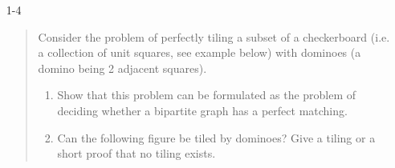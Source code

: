 \documentclass[12pt]{article}
\begin{document}




\begin{enumerate}





%
\item[1-4]
\begin{quote}
Consider the problem of perfectly tiling a subset of a checkerboard
  (i.e. a collection of unit squares, see example below) with dominoes
  (a domino being 2 adjacent squares).
\begin{enumerate}
\item
Show that this problem can be formulated as the problem of deciding
whether a bipartite graph has a perfect matching.
\item
Can the following figure be tiled by dominoes? Give a tiling or
  a short proof that no tiling exists.


\end{enumerate}
\end{quote}
\end{enumerate}
\end{document}
